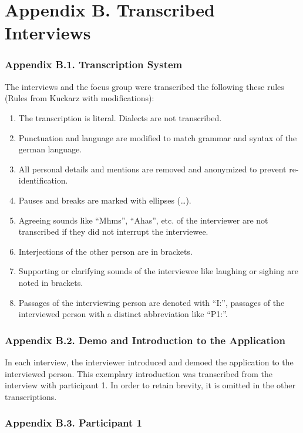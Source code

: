 \documentclass{sigchi}
\begin{document}
\twocolumn
\section{Appendix B. Transcribed Interviews}

\subsubsection{Appendix B.1. Transcription System}
The interviews and the focus group were transcribed the following these rules (Rules from Kuckarz \cite{kuckartz2007} with modifications):
\begin{enumerate}
    \item The transcription is literal. Dialects are not transcribed.
    \item Punctuation and language are modified to match grammar and syntax of the german language.
    \item All personal details and mentions are removed and anonymized to prevent re-identification.
    \item Pauses and breaks are marked with ellipses (\dots).
    \item Agreeing sounds like ``Mhms'', ``Ahas'', etc. of the interviewer are not transcribed if they did not interrupt the interviewee.
    \item Interjections of the other person are in brackets.
    \item Supporting or clarifying sounds of the interviewee like laughing or sighing are noted in brackets.
    \item Passages of the interviewing person are denoted with ``I:'', passages of the interviewed person with a distinct abbreviation like ``P1:''.
\end{enumerate}

\subsubsection{Appendix B.2. Demo and Introduction to the Application}

In each interview, the interviewer introduced and demoed the application to the interviewed person. This exemplary introduction was transcribed from the interview with participant 1. In order to retain brevity, it is omitted in the other transcriptions.



\subsubsection{Appendix B.3. Participant 1}
\end{document}
